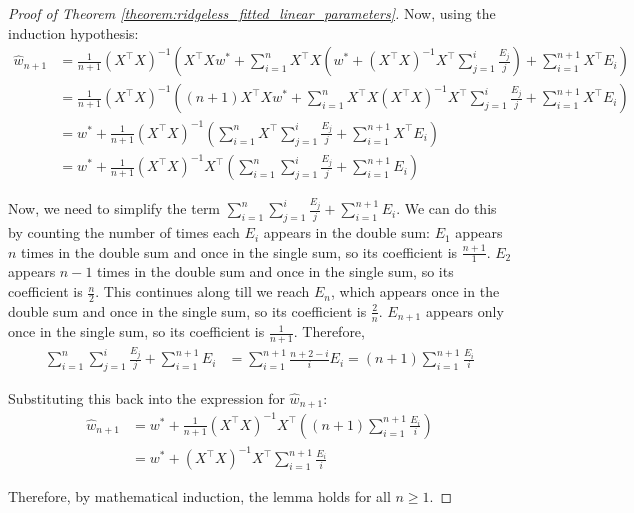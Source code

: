 \begin{proof}[Proof of Theorem \ref{theorem:ridgeless_fitted_linear_parameters}]
Now, using the induction hypothesis:
\begin{align*}
\hat{w}_{n+1} &= \frac{1}{n+1}(X^\top X)^{-1} \left(X^\top Xw^* + \sum_{i=1}^{n} X^\top X\left(w^* + (X^\top X)^{-1} X^\top \sum_{j=1}^i \frac{E_j}{j}\right) + \sum_{i=1}^{n+1} X^\top E_i\right) \\
&= \frac{1}{n+1}(X^\top X)^{-1} \left((n+1)X^\top Xw^* + \sum_{i=1}^{n} X^\top X(X^\top X)^{-1} X^\top \sum_{j=1}^i \frac{E_j}{j} + \sum_{i=1}^{n+1} X^\top E_i\right) \\
&= w^* + \frac{1}{n+1}(X^\top X)^{-1} \left(\sum_{i=1}^{n} X^\top \sum_{j=1}^i \frac{E_j}{j} + \sum_{i=1}^{n+1} X^\top E_i\right) \\
&= w^* + \frac{1}{n+1}(X^\top X)^{-1} X^\top \left(\sum_{i=1}^{n} \sum_{j=1}^i \frac{E_j}{j} + \sum_{i=1}^{n+1} E_i\right)
\end{align*}

Now, we need to simplify the term $\sum_{i=1}^{n} \sum_{j=1}^i \frac{E_j}{j} + \sum_{i=1}^{n+1} E_i$. We can do this by counting the number of times each $E_i$ appears in the double sum: $E_1$ appears $n$ times in the double sum and once in the single sum, so its coefficient is $\frac{n+1}{1}$. $E_2$ appears $n-1$ times in the double sum and once in the single sum, so its coefficient is $\frac{n}{2}$. This continues along till we reach $E_n$, which appears once in the double sum and once in the single sum, so its coefficient is $\frac{2}{n}$. $E_{n+1}$ appears only once in the single sum, so its coefficient is $\frac{1}{n+1}$. Therefore,
\begin{align*}
\sum_{i=1}^{n} \sum_{j=1}^i \frac{E_j}{j} + \sum_{i=1}^{n+1} E_i &= \sum_{i=1}^{n+1} \frac{n+2-i}{i} E_i = (n+1) \sum_{i=1}^{n+1} \frac{E_i}{i}
\end{align*}

Substituting this back into the expression for $\hat{w}_{n+1}$:
\begin{align*}
\hat{w}_{n+1} &= w^* + \frac{1}{n+1}(X^\top X)^{-1} X^\top \left((n+1) \sum_{i=1}^{n+1} \frac{E_i}{i}\right) \\
&= w^* + (X^\top X)^{-1} X^\top \sum_{i=1}^{n+1} \frac{E_i}{i}
\end{align*}



Therefore, by mathematical induction, the lemma holds for all $n \geq 1$.
\end{proof}





\clearpage
